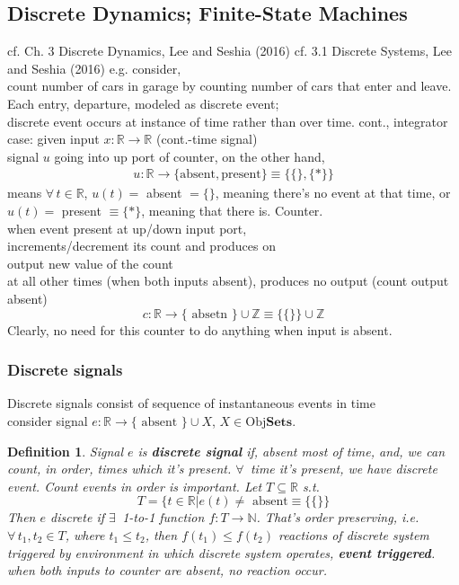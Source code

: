 \documentclass[10pt]{amsart}
\newtheorem{definition}{Definition}
\begin{document}
\begin{multicols*}{2}
\section{Discrete Dynamics; Finite-State Machines}  
cf. Ch. 3 Discrete Dynamics, Lee and Seshia (2016) \cite{LeSe2016}
cf. 3.1 Discrete Systems, Lee and Seshia (2016) \cite{LeSe2016}
e.g. consider,  \\
count number of cars in garage by counting number of cars that enter and leave.  
Each entry, departure, modeled as discrete event; \\
discrete event occurs at instance of time rather than over time.  
cont., integrator case: given input $x:\mathbb{R} \to \mathbb{R}$ (cont.-time signal) \\
signal $u$ going into up port of counter, on the other hand, 
\[
\begin{aligned}
u : \mathbb{R} \to \lbrace \text{absent}, \text{present}  \rbrace \equiv \lbrace \lbrace \rbrace, \lbrace * \rbrace \rbrace 
\end{aligned}
\]
means $\forall \, t\in \mathbb{R}$, $u(t) = $ absent $= \lbrace \rbrace$, meaning there's no event at that time, or \\
$u(t) = $ present $\equiv \lbrace * \rbrace$, meaning that there is.  
Counter.  \\
when event present at up/down input port, \\
increments/decrement its count and produces on \\
output new value of the count \\
at all other times (when both inputs absent), produces no output (count output absent)
\[
c:\mathbb{R} \to \lbrace \text{ absetn } \rbrace \cup \mathbb{Z} \equiv \lbrace \lbrace \rbrace \rbrace \cup \mathbb{Z}
\]
Clearly, no need for this counter to do anything when input is absent.  
\subsubsection{Discrete signals}
Discrete signals consist of sequence of instantaneous events in time \\
consider signal $e: \mathbb{R} \to \lbrace \text{ absent } \rbrace \cup X$, $X \in \text{Obj}\textbf{Sets}$.  
\begin{definition}
	Signal $e$ is \textbf{discrete signal} if, absent most of time, and, we can count, in order, times which it's present.  $\forall \, $ time it's present, we have discrete event.   
	Count events in order is important.  
	Let $T \subseteq \mathbb{R}$ s.t. 
	\[
	T = \lbrace t\in \mathbb{R} | e(t) \neq \text{ absent} \equiv \lbrace \lbrace \rbrace \rbrace 
	\]
	Then $e$ discrete if $\exists \, $ 1-to-1 function $f: T \to \mathbb{N}$.  That's order preserving, i.e. $\forall \, t_1,t_2 \in T$, where $t_1 \leq t_2$, then $f(t_1) \leq f(t_2)$  
	reactions of discrete system triggered by environment in which discrete system operates, \textbf{ event triggered}.  \\
	when both inputs to counter are absent, no reaction occur.  
\end{definition}

\end{multicols*}
\end{document}
